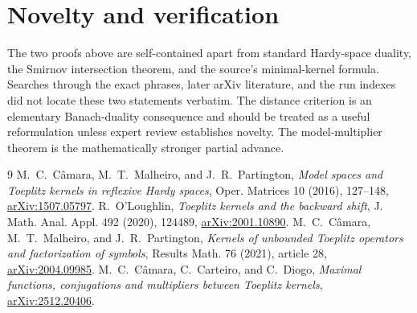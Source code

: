 \documentclass[11pt]{article}
\begin{document}
\section{Novelty and verification}

The two proofs above are self-contained apart from standard Hardy-space
duality, the Smirnov intersection theorem, and the source's minimal-kernel
formula.  Searches through the exact phrases, later arXiv literature, and the
run indexes did not locate these two statements verbatim.  The distance
criterion is an elementary Banach-duality consequence and should be treated as
a useful reformulation unless expert review establishes novelty.  The
model-multiplier theorem is the mathematically stronger partial advance.

\begin{thebibliography}{9}
 M.~C.~C\^amara, M.~T.~Malheiro, and J.~R.~Partington,
\emph{Model spaces and Toeplitz kernels in reflexive Hardy spaces}, Oper.
Matrices 10 (2016), 127--148,
\href{https://arxiv.org/abs/1507.05797}{arXiv:1507.05797}.
 R.~O'Loughlin, \emph{Toeplitz kernels and the backward shift},
J. Math. Anal. Appl. 492 (2020), 124489,
\href{https://arxiv.org/abs/2001.10890}{arXiv:2001.10890}.
 M.~C.~C\^amara, M.~T.~Malheiro, and J.~R.~Partington,
\emph{Kernels of unbounded Toeplitz operators and factorization of symbols},
Results Math. 76 (2021), article 28,
\href{https://arxiv.org/abs/2004.09985}{arXiv:2004.09985}.
 M.~C.~C\^amara, C.~Carteiro, and C.~Diogo,
\emph{Maximal functions, conjugations and multipliers between Toeplitz
kernels}, \href{https://arxiv.org/abs/2512.20406}{arXiv:2512.20406}.
\end{thebibliography}
\end{document}
